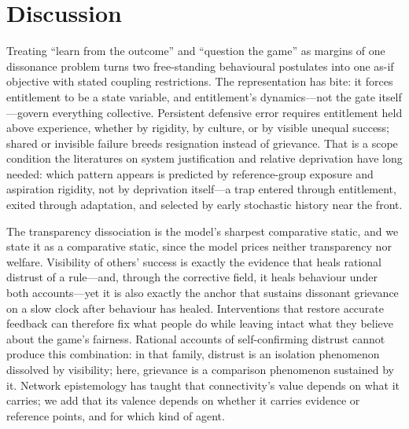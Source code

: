 \documentclass[11pt]{article}
\newcommand{\1}{\mathbf{1}}
\begin{document}
\section{Discussion}

Treating ``learn from the outcome'' and ``question the game'' as margins of one dissonance problem turns two free-standing behavioural postulates into one as-if objective with stated coupling restrictions. The representation has bite: it forces entitlement to be a state variable, and entitlement's dynamics---not the gate itself---govern everything collective. Persistent defensive error requires entitlement held above experience, whether by rigidity, by culture, or by visible unequal success; shared or invisible failure breeds resignation instead of grievance. That is a scope condition the literatures on system justification and relative deprivation have long needed\cite{JostBanajiNosek2004,SmithPettigrew2012}: which pattern appears is predicted by reference-group exposure and aspiration rigidity, not by deprivation itself---a trap entered through entitlement, exited through adaptation, and selected by early stochastic history near the front.

The transparency dissociation is the model's sharpest comparative static, and we state it as a comparative static, since the model prices neither transparency nor welfare. Visibility of others' success is exactly the evidence that heals rational distrust of a rule---and, through the corrective field, it heals behaviour under both accounts---yet it is also exactly the anchor that sustains dissonant grievance on a slow clock after behaviour has healed. Interventions that restore accurate feedback can therefore fix what people do while leaving intact what they believe about the game's fairness. Rational accounts of self-confirming distrust\cite{HeidhuesKoszegiStrack2018,EspondaPouzo2016,FrickIijimaIshii2020,BohrenHauser2021} cannot produce this combination: in that family, distrust is an isolation phenomenon dissolved by visibility; here, grievance is a comparison phenomenon sustained by it. Network epistemology has taught that connectivity's value depends on what it carries\cite{Zollman2007}; we add that its valence depends on whether it carries evidence or reference points, and for which kind of agent.
\end{document}
